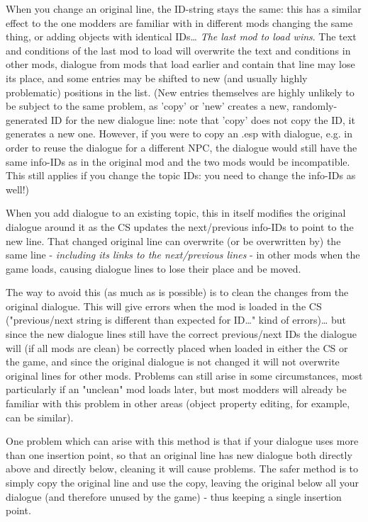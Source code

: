 When you change an original line, the ID-string stays the same: this has
a similar effect to the one modders are familiar with in different mods
changing the same thing, or adding objects with identical IDs\ldots{}
\emph{The last mod to load wins}. The text and conditions of the last
mod to load will overwrite the text and conditions in other mods,
dialogue from mods that load earlier and contain that line may lose its
place, and some entries may be shifted to new (and usually highly
problematic) positions in the list. (New entries themselves are highly
unlikely to be subject to the same problem, as 'copy' or 'new' creates a
new, randomly-generated ID for the new dialogue line: note that 'copy'
does not copy the ID, it generates a new one. However, if you were to
copy an .esp with dialogue, e.g. in order to reuse the dialogue for a
different NPC, the dialogue would still have the same info-IDs as in the
original mod and the two mods would be incompatible. This still applies
if you change the topic IDs: you need to change the info-IDs as well!)

When you add dialogue to an existing topic, this in itself modifies the
original dialogue around it as the CS updates the next/previous info-IDs
to point to the new line. That changed original line can overwrite (or
be overwritten by) the same line - \emph{including its links to the
next/previous lines} - in other mods when the game loads, causing
dialogue lines to lose their place and be moved.

The way to avoid this (as much as is possible) is to clean the changes
from the original dialogue. This will give errors when the mod is loaded
in the CS ("previous/next string is different than expected for
ID\ldots" kind of errors)\ldots{} but since the new dialogue lines still
have the correct previous/next IDs the dialogue will (if all mods are
clean) be correctly placed when loaded in either the CS or the game, and
since the original dialogue is not changed it will not overwrite
original lines for other mods. Problems can still arise in some
circumstances, most particularly if an "unclean" mod loads later, but
most modders will already be familiar with this problem in other areas
(object property editing, for example, can be similar).

One problem which can arise with this method is that if your dialogue
uses more than one insertion point, so that an original line has new
dialogue both directly above and directly below, cleaning it will cause
problems. The safer method is to simply copy the original line and use
the copy, leaving the original below all your dialogue (and therefore
unused by the game) - thus keeping a single insertion point.

